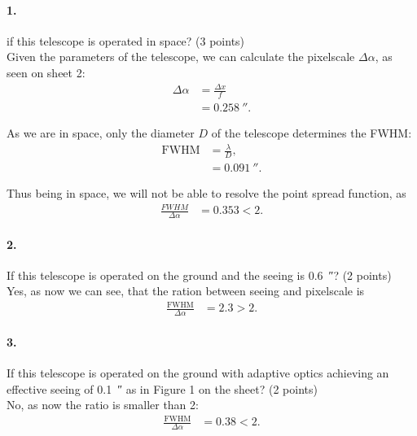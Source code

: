 \documentclass[11pt,a4paper,twoside]{article}
\begin{document}
\paragraph{1.} if this telescope is operated in space? (3 points) \\

Given the parameters of the telescope, we can calculate the pixelscale $\Delta
\alpha$, as seen on sheet 2:
\begin{align}
\Delta \alpha   &= \frac{\Delta x}{f} \\
                &= \SI{0.258}{\arcsecond}.
\end{align}

As we are in space, only the diameter $D$ of the telescope determines the 
FWHM:
\begin{align}
\mathrm{FWHM}   &= \frac{\lambda}{D},    \\
                &= \SI{0.091}{\arcsecond}.
\end{align}

Thus being in space, we will not be able to resolve the point spread function,
as
\begin{align}
\frac{FWHM}{\Delta \alpha} &= 0.353 < 2.
\end{align}

\paragraph{2.} If this telescope is operated on the ground and the seeing is
\SI{0.6}{\arcsecond}? (2 points) \\

Yes, as now we can see, that the ration between seeing and pixelscale is
\begin{align}
\frac{\mathrm{FWHM}}{\Delta\alpha} &= 2.3 > 2.
\end{align}

\paragraph{3.} If this telescope is operated on the ground with adaptive optics
achieving an effective seeing of \SI{0.1}{\arcsecond} as in Figure 1 on the
sheet? (2 points) \\

No, as now the ratio is smaller than 2:
\begin{align}
\frac{\mathrm{FWHM}}{\Delta\alpha} &= 0.38 < 2.
\end{align} \\
\end{document}
